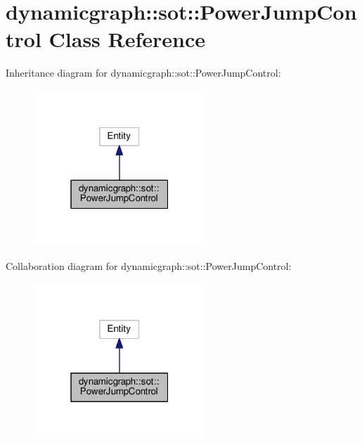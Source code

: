 \hypertarget{classdynamicgraph_1_1sot_1_1PowerJumpControl}{}\section{dynamicgraph\+:\+:sot\+:\+:Power\+Jump\+Control Class Reference}
\label{classdynamicgraph_1_1sot_1_1PowerJumpControl}


Inheritance diagram for dynamicgraph\+:\+:sot\+:\+:Power\+Jump\+Control\+:
\nopagebreak
\begin{figure}[H]
\begin{center}
\leavevmode
\includegraphics[width=183pt]{classdynamicgraph_1_1sot_1_1PowerJumpControl__inherit__graph}
\end{center}
\end{figure}


Collaboration diagram for dynamicgraph\+:\+:sot\+:\+:Power\+Jump\+Control\+:
\nopagebreak
\begin{figure}[H]
\begin{center}
\leavevmode
\includegraphics[width=183pt]{classdynamicgraph_1_1sot_1_1PowerJumpControl__coll__graph}
\end{center}
\end{figure}
